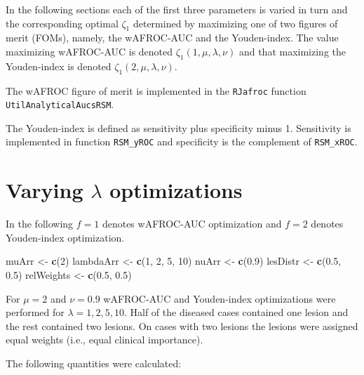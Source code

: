\documentclass[
]{book}
\newenvironment{Shaded}{\begin{snugshade}}{\end{snugshade}}
\newcommand{\DecValTok}[1]{\textcolor[rgb]{0.00,0.00,0.81}{#1}}
\newcommand{\FloatTok}[1]{\textcolor[rgb]{0.00,0.00,0.81}{#1}}
\newcommand{\KeywordTok}[1]{\textcolor[rgb]{0.13,0.29,0.53}{\textbf{#1}}}
\newcommand{\NormalTok}[1]{#1}
\newcommand{\StringTok}[1]{\textcolor[rgb]{0.31,0.60,0.02}{#1}}
\begin{document}
In the following sections each of the first three parameters is varied in turn and the corresponding optimal \(\zeta_1\) determined by maximizing one of two figures of merit (FOMs), namely, the wAFROC-AUC and the Youden-index. The value maximizing wAFROC-AUC is denoted \(\zeta_{1} \left ( 1, \mu, \lambda, \nu \right )\) and that maximizing the Youden-index is denoted \(\zeta_{1} \left ( 2, \mu, \lambda, \nu \right )\).

The wAFROC figure of merit is implemented in the \texttt{RJafroc} function \texttt{UtilAnalyticalAucsRSM}.

The Youden-index is defined as sensitivity plus specificity minus 1. Sensitivity is implemented in function \texttt{RSM\_yROC} and specificity is the complement of \texttt{RSM\_xROC}.

\hypertarget{optim-op-point-vary-lambda}{%
\section{\texorpdfstring{Varying \(\lambda\) optimizations}{Varying \textbackslash lambda optimizations}}\label{optim-op-point-vary-lambda}}

In the following \(f = 1\) denotes wAFROC-AUC optimization and \(f = 2\) denotes Youden-index optimization.

\begin{Shaded}
\begin{Highlighting}[]
\NormalTok{muArr <-}\StringTok{ }\KeywordTok{c}\NormalTok{(}\DecValTok{2}\NormalTok{)}
\NormalTok{lambdaArr <-}\StringTok{ }\KeywordTok{c}\NormalTok{(}\DecValTok{1}\NormalTok{, }\DecValTok{2}\NormalTok{, }\DecValTok{5}\NormalTok{, }\DecValTok{10}\NormalTok{)}
\NormalTok{nuArr <-}\StringTok{ }\KeywordTok{c}\NormalTok{(}\FloatTok{0.9}\NormalTok{)}
\NormalTok{lesDistr <-}\StringTok{ }\KeywordTok{c}\NormalTok{(}\FloatTok{0.5}\NormalTok{, }\FloatTok{0.5}\NormalTok{)}
\NormalTok{relWeights <-}\StringTok{ }\KeywordTok{c}\NormalTok{(}\FloatTok{0.5}\NormalTok{, }\FloatTok{0.5}\NormalTok{)}
\end{Highlighting}
\end{Shaded}

For \(\mu = 2\) and \(\nu = 0.9\) wAFROC-AUC and Youden-index optimizations were performed for \(\lambda = 1, 2, 5, 10\). Half of the diseased cases contained one lesion and the rest contained two lesions. On cases with two lesions the lesions were assigned equal weights (i.e., equal clinical importance).

The following quantities were calculated:
\end{document}
